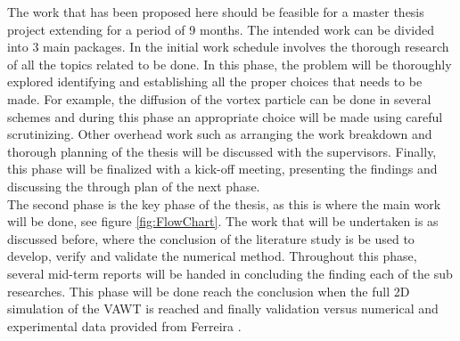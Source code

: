 
The work that has been proposed here should be feasible for a master thesis project extending for a period of 9 months.
The intended work can be divided into 3 main packages. In the initial work schedule involves the thorough research of all the topics related to be done. In this phase, the problem will be thoroughly explored identifying and establishing all the proper choices that needs to be made. For example, the diffusion of the vortex particle can be done in several schemes and during this phase an appropriate choice will be made using careful scrutinizing. Other overhead work such as arranging the work breakdown and thorough planning of the thesis will be discussed with the supervisors. Finally, this phase will be finalized with a kick-off meeting, presenting the findings and discussing the through plan of the next phase.\\

The second phase is the key phase of the thesis, as this is where the main work will be done, see figure \ref{fig:FlowChart}. The work that will be undertaken is as discussed before, where the conclusion of the literature study is be used to develop, verify and validate the numerical method. Throughout this phase, several mid-term reports will be handed in concluding the finding each of the sub researches. This phase will be done reach the conclusion when the full 2D simulation of the VAWT is reached and finally validation versus numerical and experimental data provided from Ferreira \cite{SimaoFerreira2008}. \\
 
